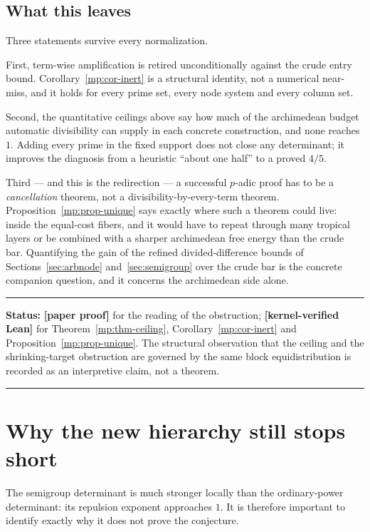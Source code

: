 \documentclass[11pt,oneside]{article}
\theoremstyle{definition}
\theoremstyle{remark}
\newcommand{\statuslean}{\textcolor{leanblue}{\textbf{[kernel-verified Lean]}}}
\newcommand{\statusnew}{\textcolor{newgreen}{\textbf{[paper proof]}}}
\newenvironment{statusbox}[1]
{\begin{center}\begin{minipage}{0.94\textwidth}\raggedright\hbadness=10000\hrule
\vspace{0.45em}\textbf{Status:} #1\par\vspace{0.35em}}
{\vspace{0.35em}\hrule\end{minipage}\end{center}}
\begin{document}
\subsection{What this leaves}

Three statements survive every normalization.

First, term-wise amplification is retired unconditionally against the crude entry bound.
Corollary~\ref{mp:cor-inert} is a structural identity, not a numerical near-miss, and it holds
for every prime set, every node system and every column set.

Second, the quantitative ceilings above say how much of the archimedean budget automatic
divisibility can supply in each concrete construction, and none reaches $1$.  Adding every
prime in the fixed support does not close any determinant; it improves the diagnosis from a
heuristic ``about one half'' to a proved $4/5$.

Third --- and this is the redirection --- a successful $p$-adic proof has to be a
\emph{cancellation} theorem, not a divisibility-by-every-term theorem.
Proposition~\ref{mp:prop-unique} says exactly where such a theorem could live: inside the
equal-cost fibers, and it would have to repeat through many tropical layers or be combined with
a sharper archimedean free energy than the crude bar.  Quantifying the gain of the refined
divided-difference bounds of Sections~\ref{sec:arbnode} and~\ref{sec:semigroup} over the crude
bar is the concrete companion question, and it concerns the archimedean side alone.

\begin{statusbox}{\statusnew{} for the reading of the obstruction; \statuslean{} for
Theorem~\ref{mp:thm-ceiling}, Corollary~\ref{mp:cor-inert} and
Proposition~\ref{mp:prop-unique}.  The structural observation that the ceiling and the
shrinking-target obstruction are governed by the same block equidistribution is recorded as an
interpretive claim, not a theorem.}
\end{statusbox}

\section{Why the new hierarchy still stops short}
\label{sec:deficit}

The semigroup determinant is much stronger locally than the ordinary-power determinant: its
repulsion exponent approaches $1$.  It is therefore important to identify exactly why it does
not prove the conjecture.
\end{document}
